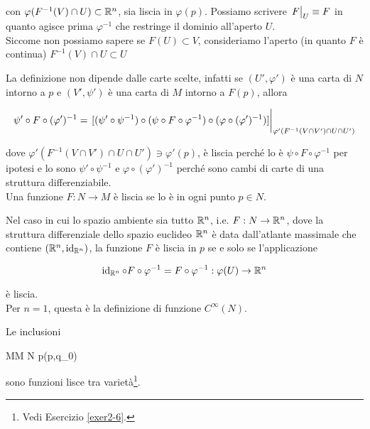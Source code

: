 con $ \varphi(F^{-1}(V) \cap U) \subset \mathbb{R}^{n} $, sia liscia in $ \varphi(p) $. Possiamo scrivere $ \eval{F}_{U} \equiv F $ in quanto agisce prima $ \varphi^{-1} $ che restringe il dominio all'aperto $ U $. \\
Siccome non possiamo sapere se $ F(U) \subset V $, consideriamo l'aperto (in quanto $ F $ è continua) $ F^{-1}(V) \cap U \subset U $


La definizione non dipende dalle carte scelte, infatti se $ (U',\varphi') $ è una carta di $ N $ intorno a $ p $ e $ (V',\psi') $ è una carta di $ M $ intorno a $ F(p) $, allora

\begin{equation}
	\psi' \circ F \circ (\varphi')^{-1} = \eval{ [(\psi' \circ \psi^{-1}) \circ (\psi \circ F \circ \varphi^{-1}) \circ (\varphi \circ (\varphi')^{-1})] }_{ \varphi'(F^{-1}(V \cap V') \cap U \cap U') }
\end{equation}

dove $ \varphi'(F^{-1}(V \cap V') \cap U \cap U') \ni \varphi'(p) $, è liscia perché lo è $ \psi \circ F \circ \varphi^{-1} $ per ipotesi e lo sono $ \psi' \circ \psi^{-1} $ e $ \varphi \circ (\varphi')^{-1} $ perché sono cambi di carte di una struttura differenziabile. \\
Una funzione $ F : N \to M $ è liscia se lo è in ogni punto $ p \in N $.

\begin{remark}
	Nel caso in cui lo spazio ambiente sia tutto $ \mathbb{R}^{n} $, i.e. $ F : N \to \mathbb{R}^{n} $, dove la struttura differenziale dello spazio euclideo $ \mathbb{R}^{n} $ è data dall'atlante massimale che contiene $ (\mathbb{R}^{n},\operatorname{id}_{\mathbb{R}^{n}}) $, la funzione $ F $ è liscia in $ p $ se e solo se l'applicazione
	
	\begin{equation}
		\operatorname{id}_{\mathbb{R}^{n}} \circ F \circ \varphi^{-1} = F \circ \varphi^{-1} : \varphi(U) \to \mathbb{R}^{n}
	\end{equation}

	è liscia. \\
	Per $ n=1 $, questa è la definizione di funzione $ C^{\infty}(N) $.
\end{remark}

\begin{remark}
	Le inclusioni
	
		{M}{M \times N}
		{p}{(p,q_{0})}
	
	sono funzioni lisce tra varietà\footnote{%
		Vedi Esercizio \ref{exer2-6}.%
	}.
\end{remark}

